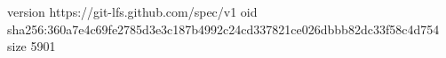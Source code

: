 version https://git-lfs.github.com/spec/v1
oid sha256:360a7e4c69fe2785d3e3c187b4992c24cd337821ce026dbbb82dc33f58c4d754
size 5901
